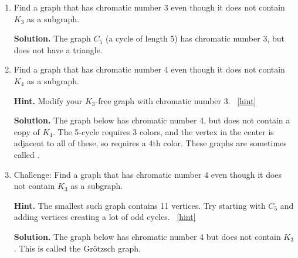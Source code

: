 \documentclass{book}
\begin{document}
\setcounter{project}{43}
\addtocounter{project}{-1}
\begin{activity}[]\label{activity-36}
\leavevmode%
\begin{enumerate}[font=\bfseries,label=(\alph*),ref=\alph*]
\item\label{task-58} \hypertarget{p-402}{}%
Find a graph that has chromatic number 3 even though it does not contain \(K_3\) as a subgraph.%
\par\smallskip%
\noindent\textbf{Solution.}\hypertarget{solution-42}{}\quad%
\hypertarget{p-403}{}%
The graph \(C_5\) (a cycle of length 5) has chromatic number 3, but does not have a triangle.%
\item\label{task-59} \hypertarget{p-404}{}%
Find a graph that has chromatic number 4 even though it does not contain \(K_4\) as a subgraph.%
\par\smallskip%
\noindent\textbf{Hint.}\hypertarget{hint-16}{}\quad%
\hypertarget{p-405}{}%
Modify your \(K_3\)-free graph with chromatic number 3.%
~\hfill{\tiny\hyperlink{a-43.b}{[hint]}\hypertarget{q-43.b}{}}\par\smallskip%
\noindent\textbf{Solution.}\hypertarget{solution-43}{}\quad%
\hypertarget{p-406}{}%
The graph below has chromatic number 4, but does not contain a copy of \(K_4\).  The 5-cycle requires 3 colors, and the vertex in the center is adjacent to all of these, so requires a 4th color.  These graphs are sometimes called .%
\begin{sidebyside}{1}{0.4}{0.4}{0}
\begin{sbspanel}{0.2}
\end{sbspanel}
\end{sidebyside}
\item\label{task-60} \hypertarget{p-407}{}%
Challenge: Find a graph that has chromatic number 4 even though it does not contain \(K_3\) as a subgraph.%
\par\smallskip%
\noindent\textbf{Hint.}\hypertarget{hint-17}{}\quad%
\hypertarget{p-408}{}%
The smallest such graph contains 11 vertices.  Try starting with \(C_5\) and adding vertices creating a lot of odd cycles.%
~\hfill{\tiny\hyperlink{a-43.c}{[hint]}\hypertarget{q-43.c}{}}\par\smallskip%
\noindent\textbf{Solution.}\hypertarget{solution-44}{}\quad%
\hypertarget{p-409}{}%
The graph below has chromatic number 4 but does not contain \(K_3\).  This is called the Grötzsch graph.%
\begin{sidebyside}{1}{0.35}{0.35}{0}
\begin{sbspanel}{0.3}
\end{sbspanel}
\end{sidebyside}
\end{enumerate}
\end{activity}
\end{document}
